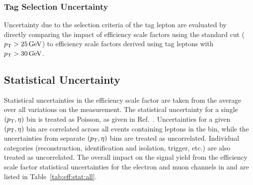 

\subsubsection{Tag Selection Uncertainty}
Uncertainty due to the selection criteria of the tag lepton are evaluated by directly comparing the impact of efficiency scale factors using the standard cut ($p_{\mathrm{T}} > 25 \,\text{Ge\hspace{-.08em}V}$) to efficiency scale factors derived using tag leptons with $p_{\mathrm{T}} > 30\,\text{Ge\hspace{-.08em}V}$. 


\subsection{Statistical Uncertainty}
Statistical uncertainties in the efficiency scale factor are taken from the average over all variations on the measurement. The statistical uncertainty for a single $(p_{\mathrm{T}},\eta)$ bin is treated as Poisson, as given in Ref.~\cite{Paterno:2004cb}. Uncertainties for a given $(p_{\mathrm{T}},\eta)$ bin are correlated across all events containing leptons in the bin, while the uncertainties from separate $(p_{\mathrm{T}},\eta)$ bins are treated as uncorrelated. Individual categories (reconstruction, identification and isolation, trigger, etc.) are also treated as uncorrelated. The overall impact on the signal yield from the efficiency scale factor statistical uncertainties for the electron and muon channels in \sg and \sh are listed in Table~\ref{tab:eff:stat:all}.


% 
% 
% 
% 
% 
% 



